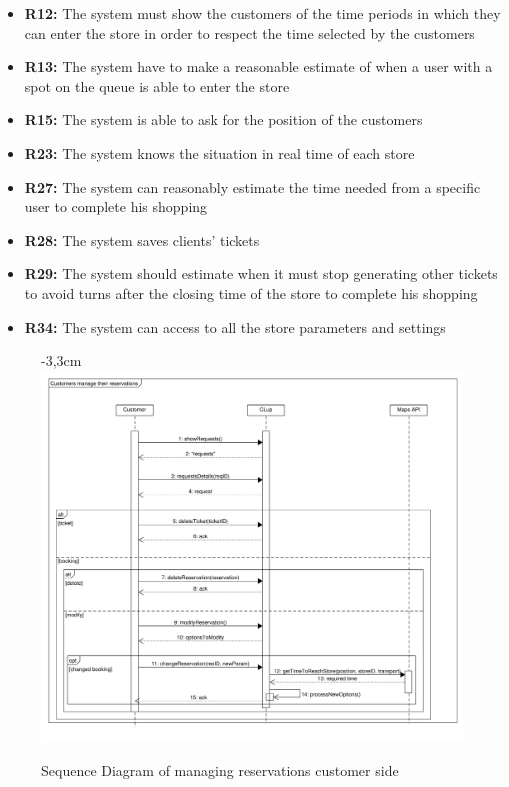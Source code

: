 \documentclass{article}
\begin{document}
\begin{center}
\begin{itemize}
						\item {\bfseries R12: } The system must show the customers of the time periods in which they can
						enter the store in order to respect the time selected by the customers
						\item {\bfseries R13: } The system have to make a reasonable estimate of when a user with a spot
						on the queue is able to enter the store
						\item {\bfseries R15: } The system is able to ask for the position of the customers
						\item {\bfseries R23: } The system knows the situation in real time of each store
						\item {\bfseries R27: } The system can reasonably estimate the time needed from a specific user
						to complete his shopping
						\item {\bfseries R28: } The system saves clients' tickets
						
						\item {\bfseries R29: } The system should estimate when it must stop generating other tickets to
						avoid turns after the closing time of the store
						to complete his shopping
						\item {\bfseries R34: } The system can access to all the store parameters and settings

						
						
					\end{itemize}
				

				\end{center}
			\newpage
			\begin{figure}[!htb]
				\begin{adjustwidth} {-3,3cm}{}
					\centering
					\includegraphics[scale=0.5]{SD/10_manageReservation(customer).pdf}\\
					\caption{Sequence Diagram of managing reservations customer side}
				\end{adjustwidth}
			\end{figure}
		\newpage
		
\end{document}
